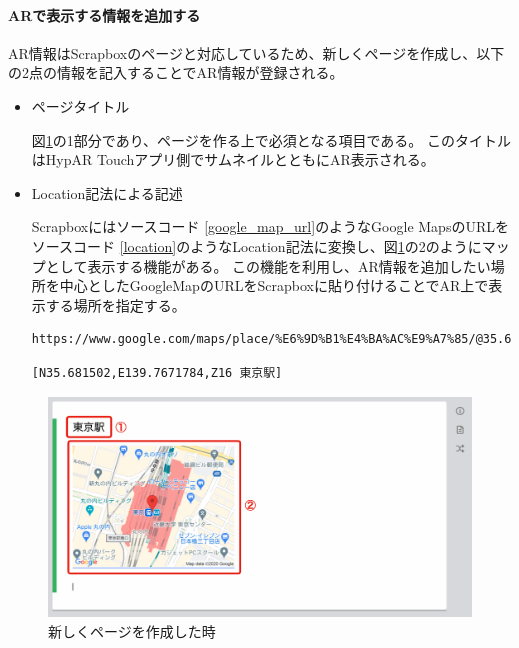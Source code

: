 \paragraph*{ARで表示する情報を追加する}
AR情報はScrapboxのページと対応しているため、新しくページを作成し、以下の2点の情報を記入することでAR情報が登録される。
\begin{itemize}
  \item ページタイトル
  
  図\ref{fig:scrapbox_ar_new}の\textcircled{\scriptsize{1}}部分であり、ページを作る上で必須となる項目である。
  このタイトルはHypAR Touchアプリ側でサムネイルとともにAR表示される。

  \item Location記法による記述
  
  Scrapboxにはソースコード \ref{google_map_url}のようなGoogle MapsのURLをソースコード \ref{location}のようなLocation記法に変換し、図\ref{fig:scrapbox_ar_new}の\textcircled{\scriptsize{2}}のようにマップとして表示する機能がある。
  この機能を利用し、AR情報を追加したい場所を中心としたGoogleMapのURLをScrapboxに貼り付けることでAR上で表示する場所を指定する。

  \begin{lstlisting}[caption=googleMapのURL, label=google_map_url]
    https://www.google.com/maps/place/%E6%9D%B1%E4%BA%AC%E9%A7%85/@35.681502,139.7671784,17z/data=!4m5!3m4!1s0x60188bfbd89f700b:0x277c49ba34ed38!8m2!3d35.6812362!4d139.7671248
  \end{lstlisting}

  \begin{lstlisting}[caption=Location記法, label=location]
    [N35.681502,E139.7671784,Z16 東京駅]
  \end{lstlisting}
\end{itemize}

\begin{figure}[h]
  \centering
  \includegraphics[width=120mm]{images/scrapbox_ar_new.png}
  \caption{新しくページを作成した時} \label{fig:scrapbox_ar_new}
\end{figure}

